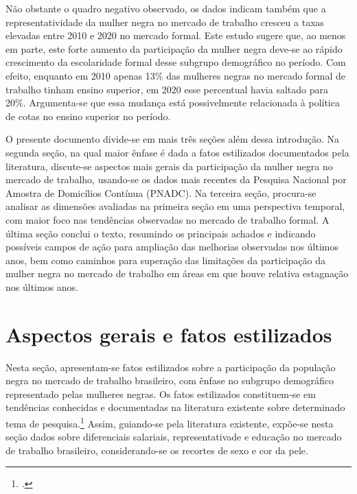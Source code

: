 \documentclass[12pt]{article}
\begin{document}
\par Não obstante o quadro negativo observado, os dados indicam também que a representatividade da mulher negra no mercado de trabalho cresceu a taxas elevadas entre 2010 e 2020 no mercado formal. Este estudo sugere que, ao menos em parte, este forte aumento da participação da mulher negra deve-se ao rápido crescimento da escolaridade formal desse subgrupo demográfico no período. Com efeito, enquanto em 2010 apenas 13\% das mulheres negras no mercado formal de trabalho tinham ensino superior, em 2020 esse percentual havia saltado para 20\%. Argumenta-se que essa mudança está possivelmente relacionada à política de cotas no ensino superior no período.


\par O presente documento divide-se em mais três seções além dessa introdução. Na segunda seção, na qual maior ênfase é dada a fatos estilizados documentados pela literatura, discute-se aspectos mais gerais da participação da mulher negra no mercado de trabalho, usando-se os dados mais recentes da Pesquisa Nacional por Amostra de Domicílios Contínua (PNADC). Na terceira seção, procura-se analisar as dimensões avaliadas na primeira seção em uma perspectiva temporal, com maior foco nas tendências observadas no mercado de trabalho formal. A última seção conclui o texto, resumindo os principais achados e indicando possíveis campos de ação para ampliação das melhorias observadas nos últimos anos, bem como caminhos para superação das limitações da participação da mulher negra no mercado de trabalho em áreas em que houve relativa estagnação nos últimos anos.

\section{Aspectos gerais e fatos estilizados} \label{overview}

\par Nesta seção, apresentam-se fatos estilizados sobre a participação da população negra no mercado de trabalho brasileiro, com ênfase no subgrupo demográfico representado pelas mulheres negras. Os fatos estilizados constituem-se em tendências conhecidas e documentadas na literatura existente sobre determinado tema de pesquisa.\footcite[178]{kaldor1961capital} Assim, guiando-se pela literatura existente, expõe-se nesta seção dados sobre diferenciais salariais, representativade e educação no mercado de trabalho brasileiro, considerando-se os recortes de sexo e cor da pele.
\end{document}
